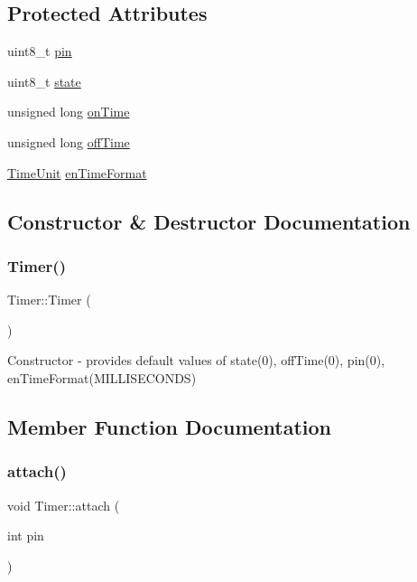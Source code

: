 \subsection*{Protected Attributes}
\begin{DoxyCompactItemize}
\item 
uint8\+\_\+t \hyperlink{class_timer_a1452d92813046e6badb287f30789580e}{pin}
\item 
uint8\+\_\+t \hyperlink{class_timer_a436bf19bc3bd3dc1c07751adbc1dbe42}{state}
\item 
unsigned long \hyperlink{class_timer_afa967387e3e6c7506334fcd886ea152a}{on\+Time}
\item 
unsigned long \hyperlink{class_timer_a884fa0db2b95029da69e11fbb53612b2}{off\+Time}
\item 
\hyperlink{_timer_8h_add9fe45e09605eee3e4a39c8a5c4476d}{Time\+Unit} \hyperlink{class_timer_a420f780693d99cab0cad9ae8202d834e}{en\+Time\+Format}
\end{DoxyCompactItemize}


\subsection{Constructor \& Destructor Documentation}
\hypertarget{class_timer_a5f16e8da27d2a5a5242dead46de05d97}{}\label{class_timer_a5f16e8da27d2a5a5242dead46de05d97} 
\subsubsection{\texorpdfstring{Timer()}{Timer()}}
{\footnotesize\ttfamily Timer\+::\+Timer (\begin{DoxyParamCaption}{ }\end{DoxyParamCaption})}

Constructor -\/ provides default values of state(0), off\+Time(0), pin(0), en\+Time\+Format(\+M\+I\+L\+L\+I\+S\+E\+C\+O\+N\+D\+S) 

\subsection{Member Function Documentation}
\hypertarget{class_timer_a74db93921810ee98d337ed3cdc2bc513}{}\label{class_timer_a74db93921810ee98d337ed3cdc2bc513} 
\subsubsection{\texorpdfstring{attach()}{attach()}\hspace{0.1cm}{\footnotesize\ttfamily [1/2]}}
{\footnotesize\ttfamily void Timer\+::attach (\begin{DoxyParamCaption}\item[{int}]{pin }\end{DoxyParamCaption})}

